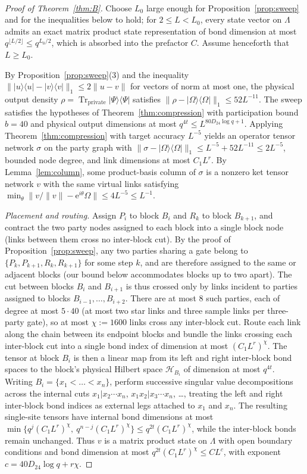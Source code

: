 \documentclass[aps,prx,reprint,superscriptaddress,floatfix,nofootinbib,longbibliography,amsmath,amssymb]{revtex4-2}
\newcommand{\Tr}{\operatorname{Tr}}
\newcommand{\norm}[1]{\lVert #1\rVert}
\providecommand{\ket}[1]{|#1\rangle}\renewcommand{\ket}[1]{|#1\rangle}
\providecommand{\bra}[1]{\langle #1|}\renewcommand{\bra}[1]{\langle #1|}
\newcommand{\cH}{\mathcal H}
\newcommand{\Om}{\Omega}
\newcommand{\Lam}{\Lambda}
\newcommand{\e}{\mathrm e}
\theoremstyle{plain}
\theoremstyle{definition}
\newcommand{\precisely}{\par\noindent{\bfseries Precisely.}\ }
\begin{document}
\precisely
\begin{proof}[Proof of Theorem~\ref{thm:B}]
Choose $L_0$ large enough for Proposition~\ref{prop:sweep} and for the
inequalities below to hold; for $2\le L<L_0$, every state vector on $\Lam$ admits an exact
matrix product state representation of bond dimension at most $q^{\lfloor L/2\rfloor}\le
q^{L_0/2}$, which is absorbed into the prefactor $C$. Assume henceforth that $L\ge L_0$.

By Proposition~\ref{prop:sweep}(3) and the inequality
$\norm{\ket u\bra u-\ket v\bra v}_1\le2\norm{u-v}$ for vectors of norm at
most one, the physical output density
$\rho=\Tr_{\mathrm{private}}\ket\Psi\bra\Psi$ satisfies
$\norm{\rho-\ket\Om\bra\Om}_1\le 52L^{-11}$. The sweep satisfies the
hypotheses of Theorem~\ref{thm:compression} with participation bound $b=40$ and physical
output dimensions at most $q^{4t}\le L^{80D_{24}\log q+1}$. Applying Theorem~\ref{thm:compression} with target
accuracy $L^{-5}$ yields an operator tensor network $\sigma$ on the party
graph with $\norm{\sigma-\ket\Om\bra\Om}_1\le L^{-5}+52L^{-11}\le2L^{-5}$,
bounded node degree, and link dimensions at most $C_1L^{r}$. By
Lemma~\ref{lem:column}, some product-basis column of $\sigma$ is a nonzero ket tensor network $v$ with the
same virtual links satisfying $\min_\theta\norm{v/\norm v-\e^{i\theta}\Om}\le4L^{-5}\le L^{-1}$.

\emph{Placement and routing.} Assign $P_i$ to block $B_i$ and $R_k$ to block $B_{k+1}$, and
contract the two party nodes assigned to each block into a single block node (links between them
cross no inter-block cut). By the proof of
Proposition~\ref{prop:sweep}, any two parties sharing a gate belong to
$\{P_k,P_{k+1},R_k,R_{k+1}\}$ for some step $k$, and are therefore assigned to the same
or adjacent blocks (our bound below accommodates blocks up to two apart). The cut between blocks $B_i$ and $B_{i+1}$ is thus
crossed only by links incident to parties assigned to blocks
$B_{i-1},\dots,B_{i+2}$. There are at most $8$ such parties, each of degree at most
$5\cdot40$ (at most two star links and three sample links per three-party
gate), so at most $\chi:=1600$ links cross any inter-block cut. Route each link along the chain
between its endpoint blocks and bundle the links crossing each inter-block cut into a single
bond index of dimension at most $(C_1L^r)^{\chi}$. The tensor at block $B_i$ is
then a linear map from its left and right inter-block bond spaces to the block's
physical Hilbert space $\cH_{B_i}$ of dimension at most $q^{4t}$. Writing
$B_i=\{x_1<\dots<x_n\}$, perform successive singular value decompositions
across the internal cuts $x_1|x_2\cdots x_n$, $x_1x_2|x_3\cdots x_n$, \dots,
treating the left and right inter-block bond indices as external legs attached to
$x_1$ and $x_n$. The resulting single-site tensors have internal
bond dimensions at most $\min\{q^{j}(C_1L^r)^\chi,\ q^{n-j}(C_1L^r)^\chi\}\le
q^{2t}(C_1L^r)^{\chi}$, while the inter-block bonds remain unchanged. Thus $v$ is a
matrix product state on $\Lam$ with open boundary conditions and bond
dimension at most $q^{2t}(C_1L^r)^\chi\le CL^{c}$, with exponent
$c=40D_{24}\log q+r\chi$.
\end{proof}
\end{document}

